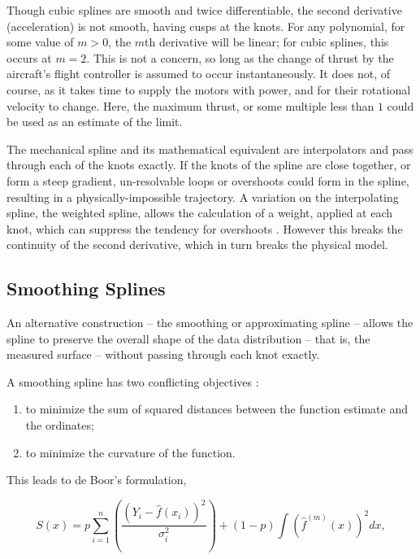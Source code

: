 \documentclass[doc]{apa6}
\begin{document}
Though cubic splines are smooth and twice differentiable, the second derivative (acceleration) is not smooth, having cusps at the knots. For any polynomial, for some value of $m > 0$, the $m$th derivative will be linear; for cubic splines, this occurs at $m = 2$. This is not a concern, so long as the change of thrust by the aircraft's flight controller is assumed to occur instantaneously. It does not, of course, as it takes time to supply the motors with power, and for their rotational velocity to change. Here, the maximum thrust, or some multiple less than $1$ could be used as an estimate of the limit.

The mechanical spline and its mathematical equivalent are interpolators and pass through each of the knots exactly. If the knots of the spline are close together, or form a steep gradient, un-resolvable loops or overshoots could form in the spline, resulting in a physically-impossible trajectory. A variation on the interpolating spline, the weighted spline, allows the calculation of a weight, applied at each knot, which can suppress the tendency for overshoots \parencite{lancaster1986curve}. However this breaks the continuity of the second derivative, which in turn breaks the physical model.


\subsection{Smoothing Splines}

An alternative construction -- the smoothing or approximating spline -- allows the spline to preserve the overall shape of the data distribution -- that is, the measured surface -- without passing through each knot exactly.

A smoothing spline has two conflicting objectives \parencite{lancaster1986curve, Drakos2002, Boor2001, Reinsch1967}:
\begin{enumerate}
\item to minimize the sum of squared distances between the function estimate and the ordinates;
\item to minimize the curvature of the function.
\end{enumerate}

This leads to de Boor's formulation,

\begin{equation}
S(x) = p \sum_{i=1}^{n} \left( \frac{(Y_i - \hat{f}(x_i))^2}{\sigma_i^2} \right) + (1 - p) \int{ \left( \hat{f}^{(m)}(x) \right)^2 } dx,
\end{equation}
\end{document}
